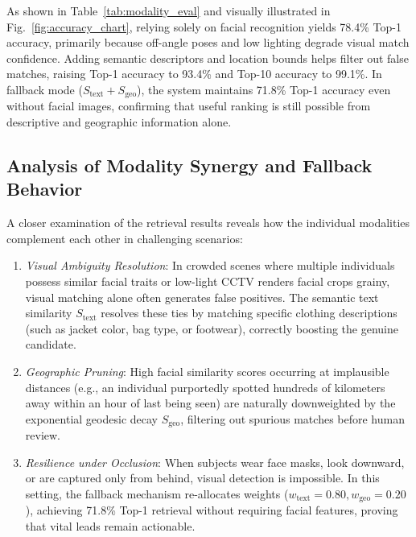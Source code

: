 \documentclass[conference]{IEEEtran}
\begin{document}
As shown in Table~\ref{tab:modality_eval} and visually illustrated in Fig.~\ref{fig:accuracy_chart}, relying solely on facial recognition yields 78.4\% Top-1 accuracy, primarily because off-angle poses and low lighting degrade visual match confidence. Adding semantic descriptors and location bounds helps filter out false matches, raising Top-1 accuracy to 93.4\% and Top-10 accuracy to 99.1\%. In fallback mode ($S_{\text{text}} + S_{\text{geo}}$), the system maintains 71.8\% Top-1 accuracy even without facial images, confirming that useful ranking is still possible from descriptive and geographic information alone.

\subsection{Analysis of Modality Synergy and Fallback Behavior}
A closer examination of the retrieval results reveals how the individual modalities complement each other in challenging scenarios:
\begin{enumerate}
    \item \textit{Visual Ambiguity Resolution}: In crowded scenes where multiple individuals possess similar facial traits or low-light CCTV renders facial crops grainy, visual matching alone often generates false positives. The semantic text similarity $S_{\text{text}}$ resolves these ties by matching specific clothing descriptions (such as jacket color, bag type, or footwear), correctly boosting the genuine candidate.
    \item \textit{Geographic Pruning}: High facial similarity scores occurring at implausible distances (e.g., an individual purportedly spotted hundreds of kilometers away within an hour of last being seen) are naturally downweighted by the exponential geodesic decay $S_{\text{geo}}$, filtering out spurious matches before human review.
    \item \textit{Resilience under Occlusion}: When subjects wear face masks, look downward, or are captured only from behind, visual detection is impossible. In this setting, the fallback mechanism re-allocates weights ($w_{\text{text}} = 0.80, w_{\text{geo}} = 0.20$), achieving 71.8\% Top-1 retrieval without requiring facial features, proving that vital leads remain actionable.
\end{enumerate}

\end{document}
